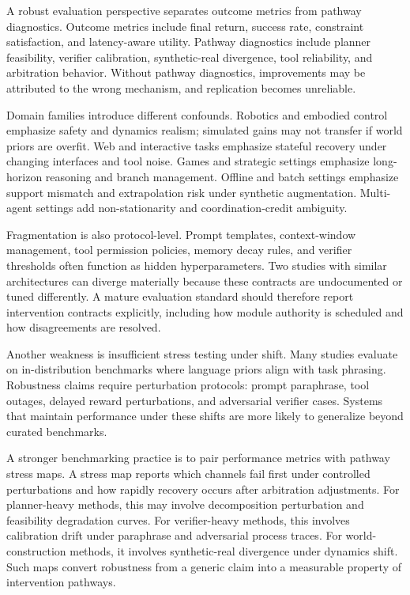 \documentclass[pdflatex,sn-mathphys-num]{sn-jnl}
\begin{document}
A robust evaluation perspective separates outcome metrics from pathway diagnostics. Outcome metrics include final return, success rate, constraint satisfaction, and latency-aware utility. Pathway diagnostics include planner feasibility, verifier calibration, synthetic-real divergence, tool reliability, and arbitration behavior. Without pathway diagnostics, improvements may be attributed to the wrong mechanism, and replication becomes unreliable.

Domain families introduce different confounds. Robotics and embodied control emphasize safety and dynamics realism; simulated gains may not transfer if world priors are overfit. Web and interactive tasks emphasize stateful recovery under changing interfaces and tool noise. Games and strategic settings emphasize long-horizon reasoning and branch management. Offline and batch settings emphasize support mismatch and extrapolation risk under synthetic augmentation. Multi-agent settings add non-stationarity and coordination-credit ambiguity.

Fragmentation is also protocol-level. Prompt templates, context-window management, tool permission policies, memory decay rules, and verifier thresholds often function as hidden hyperparameters. Two studies with similar architectures can diverge materially because these contracts are undocumented or tuned differently. A mature evaluation standard should therefore report intervention contracts explicitly, including how module authority is scheduled and how disagreements are resolved.

Another weakness is insufficient stress testing under shift. Many studies evaluate on in-distribution benchmarks where language priors align with task phrasing. Robustness claims require perturbation protocols: prompt paraphrase, tool outages, delayed reward perturbations, and adversarial verifier cases. Systems that maintain performance under these shifts are more likely to generalize beyond curated benchmarks.

A stronger benchmarking practice is to pair performance metrics with pathway stress maps. A stress map reports which channels fail first under controlled perturbations and how rapidly recovery occurs after arbitration adjustments. For planner-heavy methods, this may involve decomposition perturbation and feasibility degradation curves. For verifier-heavy methods, this involves calibration drift under paraphrase and adversarial process traces. For world-construction methods, it involves synthetic-real divergence under dynamics shift. Such maps convert robustness from a generic claim into a measurable property of intervention pathways.
\end{document}
